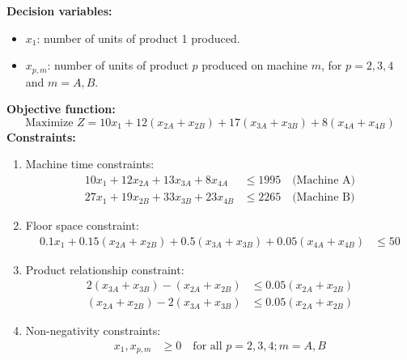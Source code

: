 \documentclass[a4paper,10pt]{article}
\begin{document}
\textbf{Decision variables:}
\begin{itemize}
    \item $x_{1}$: number of units of product 1 produced.
    \item $x_{p,m}$: number of units of product $p$ produced on machine $m$, for $p=2,3,4$ and $m=A,B$.
\end{itemize}
\textbf{Objective function:}
\begin{equation*}
    \text{Maximize } Z = 10x_{1} + 12(x_{2A} + x_{2B}) + 17(x_{3A} + x_{3B}) + 8(x_{4A} + x_{4B})
\end{equation*}
\textbf{Constraints:}
\begin{enumerate}
    \item Machine time constraints:
    \begin{align*}
        10x_{1} + 12x_{2A} + 13x_{3A} + 8x_{4A} &\leq 1995 \quad \text{(Machine A)} \\
        27x_{1} + 19x_{2B} + 33x_{3B} + 23x_{4B} &\leq 2265 \quad \text{(Machine B)}
    \end{align*}
    
    \item Floor space constraint:
    \begin{align*}
        0.1x_{1} + 0.15(x_{2A} + x_{2B}) + 0.5(x_{3A} + x_{3B}) + 0.05(x_{4A} + x_{4B}) &\leq 50
    \end{align*}
    
    \item Product relationship constraint:
    \begin{align*}
        2(x_{3A} + x_{3B}) - (x_{2A} + x_{2B}) &\leq 0.05(x_{2A} + x_{2B}) \\
        (x_{2A} + x_{2B}) - 2(x_{3A} + x_{3B}) &\leq 0.05(x_{2A} + x_{2B})
    \end{align*}
    
    \item Non-negativity constraints:
    \begin{align*}
        x_{1}, x_{p,m} &\geq 0 \quad \text{for all } p=2,3,4; m=A,B
    \end{align*}
\end{enumerate}
\end{document}
